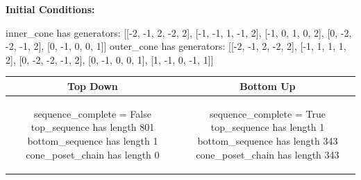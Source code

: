 \documentclass[10pt]{article}
\begin{document}
\textbf{Initial Conditions:}
\begin{SAGE}
inner_cone has generators: 
[[-2, -1, 2, -2, 2], [-1, -1, 1, -1, 2], [-1, 0, 1, 0, 2], [0, -2, -2, -1, 2], [0, -1, 0, 0, 1]]
outer_cone has generators: 
[[-2, -1, 2, -2, 2], [-1, 1, 1, 1, 2], [0, -2, -2, -1, 2], [0, -1, 0, 0, 1], [1, -1, 0, -1, 1]]

\end{SAGE}
\begin{tabular}{c|c}
\textbf{Top Down} & \textbf{Bottom Up} \\ \hline  
\begin{SAGE}
sequence_complete = False
top_sequence has length 801
bottom_sequence has length 1
cone_poset_chain has length 0
\end{SAGE} 
&
\begin{SAGE}
sequence_complete = True
top_sequence has length 1
bottom_sequence has length 343
cone_poset_chain has length 343
\end{SAGE} 
\\ \hline


\end{tabular}
\end{document}

